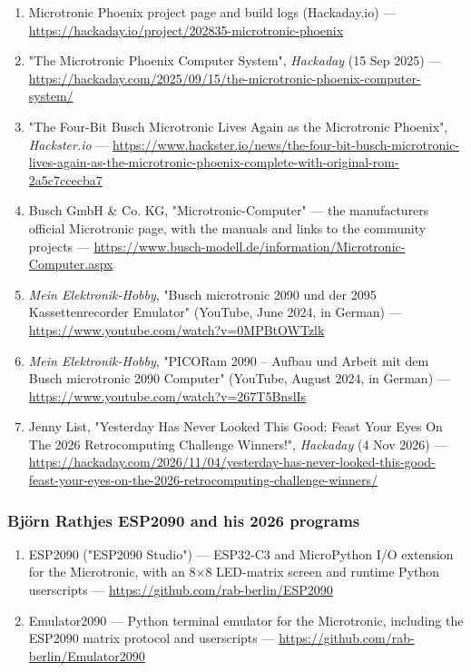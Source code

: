 \documentclass[
  11pt,
  letterpaper,
]{article}
\providecommand{\tightlist}{%
  \setlength{\itemsep}{0pt}\setlength{\parskip}{0pt}}
\begin{document}
\begin{enumerate}
\def\labelenumi{\arabic{enumi}.}
\setcounter{enumi}{45}
\tightlist
\item
  Microtronic Phoenix project page and build logs (Hackaday.io) ---
  \url{https://hackaday.io/project/202835-microtronic-phoenix}
\item
  "The Microtronic Phoenix Computer System", \emph{Hackaday} (15 Sep
  2025) ---
  \url{https://hackaday.com/2025/09/15/the-microtronic-phoenix-computer-system/}
\item
  "The Four-Bit Busch Microtronic Lives Again as the Microtronic
  Phoenix", \emph{Hackster.io} ---
  \url{https://www.hackster.io/news/the-four-bit-busch-microtronic-lives-again-as-the-microtronic-phoenix-complete-with-original-rom-2a5c7ccecba7}
\item
  Busch GmbH \& Co. KG, "Microtronic-Computer" --- the
  manufacturer\textquotesingle s official Microtronic page, with the
  manuals and links to the community projects ---
  \url{https://www.busch-modell.de/information/Microtronic-Computer.aspx}
\item
  \emph{Mein Elektronik-Hobby}, "Busch microtronic 2090 und der 2095
  Kassettenrecorder Emulator" (YouTube, June 2024, in German) ---
  \url{https://www.youtube.com/watch?v=0MPBtOWTzlk}
\item
  \emph{Mein Elektronik-Hobby}, "PICORam 2090 -- Aufbau und Arbeit mit
  dem Busch microtronic 2090 Computer" (YouTube, August 2024, in German)
  --- \url{https://www.youtube.com/watch?v=267T5BnslIs}
\item
  Jenny List, "Yesterday Has Never Looked This Good: Feast Your Eyes On
  The 2026 Retrocomputing Challenge Winners!", \emph{Hackaday} (4 Nov
  2026) ---
  \url{https://hackaday.com/2026/11/04/yesterday-has-never-looked-this-good-feast-your-eyes-on-the-2026-retrocomputing-challenge-winners/}
\end{enumerate}

\subsubsection{Björn Rathje\textquotesingle s ESP2090 and his 2026
programs}\label{bjuxf6rn-rathjes-esp2090-and-his-2026-programs}

\begin{enumerate}
\def\labelenumi{\arabic{enumi}.}
\setcounter{enumi}{52}
\tightlist
\item
  ESP2090 ("ESP2090 Studio") --- ESP32-C3 and MicroPython I/O extension
  for the Microtronic, with an 8×8 LED-matrix screen and runtime Python
  userscripts --- \url{https://github.com/rab-berlin/ESP2090}
\item
  Emulator2090 --- Python terminal emulator for the Microtronic,
  including the ESP2090 matrix protocol and userscripts ---
  \url{https://github.com/rab-berlin/Emulator2090}
\end{enumerate}
\end{document}
